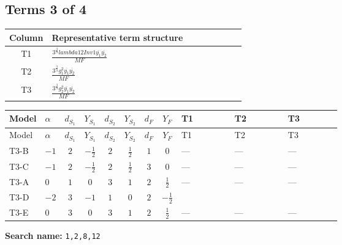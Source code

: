 \documentclass[8pt]{article}
\begin{document}
\begin{landscape}
\subsection*{Terms 3 of 4}
\begin{center}
\begin{tabular}{@{}c >{\raggedright\arraybackslash}p{0.82\linewidth}@{}}
\toprule
Column & Representative term structure \\
\midrule
T1 & \(\displaystyle \frac{3^{\frac{3}{4}} lambda12Inv1 \overline{y_{1}} \overline{y_{2}}}{MF}\) \\
\midrule
T2 & \(\displaystyle \frac{3^{\frac{3}{4}} g_{1}^{2} \overline{y_{1}} \overline{y_{2}}}{MF}\) \\
\midrule
T3 & \(\displaystyle \frac{3^{\frac{3}{4}} g_{2}^{2} \overline{y_{1}} \overline{y_{2}}}{MF}\) \\
\midrule
\bottomrule
\end{tabular}
\end{center}
\smallskip
\tiny
\begin{longtable}{@{}llcccccc >{\raggedright\arraybackslash}p{0.21\linewidth} >{\raggedright\arraybackslash}p{0.21\linewidth} >{\raggedright\arraybackslash}p{0.21\linewidth}@{}}
\toprule
Model & $\alpha$ & $d_{S_1}$ & $Y_{S_1}$ & $d_{S_2}$ & $Y_{S_2}$ & $d_F$ & $Y_F$ & T1 & T2 & T3 \\
\midrule
\endfirsthead
\toprule
Model & $\alpha$ & $d_{S_1}$ & $Y_{S_1}$ & $d_{S_2}$ & $Y_{S_2}$ & $d_F$ & $Y_F$ & T1 & T2 & T3 \\
\midrule
\endhead
T3-B & $-1$ & $2$ & $-\frac{1}{2}$ & $2$ & $\frac{1}{2}$ & $1$ & $0$ & --- & --- & --- \\
\midrule
T3-C & $-1$ & $2$ & $-\frac{1}{2}$ & $2$ & $\frac{1}{2}$ & $3$ & $0$ & --- & --- & --- \\
\midrule
T3-A & $0$ & $1$ & $0$ & $3$ & $1$ & $2$ & $\frac{1}{2}$ & --- & --- & --- \\
\midrule
T3-D & $-2$ & $3$ & $-1$ & $1$ & $0$ & $2$ & $-\frac{1}{2}$ & \scriptsize\adjustbox{max width=\linewidth}{$\begin{gathered} \frac{3^{\frac{3}{4}} lambda12Inv1 \overline{y_{1}} \overline{y_{2}}}{6 MF}\end{gathered}$} & \scriptsize\adjustbox{max width=\linewidth}{$\begin{gathered} \frac{3^{\frac{3}{4}} g_{1}^{2} \overline{y_{1}} \overline{y_{2}}}{8 MF}\end{gathered}$} & \scriptsize\adjustbox{max width=\linewidth}{$\begin{gathered} \frac{25 \cdot 3^{\frac{3}{4}} g_{2}^{2} \overline{y_{1}} \overline{y_{2}}}{24 MF}\end{gathered}$} \\
\midrule
T3-E & $0$ & $3$ & $0$ & $3$ & $1$ & $2$ & $\frac{1}{2}$ & --- & --- & --- \\
\midrule
\bottomrule
\end{longtable}
\clearpage
\noindent\textbf{Search name: }\texttt{1,2,8,12}\par\smallskip

\end{landscape}
\end{document}
